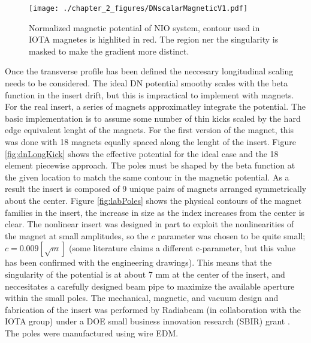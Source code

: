 \begin{figure}
	\centering
	\texttt{[image: ./chapter\_2\_figures/DNscalarMagneticV1.pdf]}
	\caption{Normalized magnetic potential of NIO system, contour used in IOTA magnetes is highlited in red. The region ner the singularity is masked to make the gradient more distinct.}
	\label{fig:dnMagPtCurve}
\end{figure}

Once the transverse profile has been defined the neccesary longitudinal scaling needs to be considered. The ideal DN potential smoothy scales with the beta function in the insert drift, but this is impractical to implement with magnets. For the real insert, a series of magnets approximatley integrate the potential. The basic implementation is to assume some number of thin kicks scaled by the hard edge equivalent lenght of the magnets. For the first version of the magnet, this was done with 18 magnets equally spaced along the lenght of the insert. Figure \ref{fig:dnLongKick} shows the effective potential for the ideal case and the 18 element piecewise approach. The poles must be shaped by the beta function at the given location to match the same contour in the magnetic potential. As a result the insert is composed of 9 unique pairs of magnets arranged symmetrically about the center. Figure \ref{fig:labPoles} shows the physical contours of the magnet families in the insert, the increase in size as the index increases from the center is clear. The nonlinear insert was designed in part to exploit the nonlinearities of the magnet at small amplitudes, so the $c$ parameter was chosen to be quite small; $c=0.009 [\sqrt{m}]$ (some literature claims a different c-parameter, but this value has been confirmed with the engineering drawings). This means that the singularity of the potential is at about 7 mm at the center of the insert, and neccesitates a carefully designed beam pipe to maximize the available aperture within the small poles. The mechanical, magnetic, and vacuum design and fabrication of the insert was performed by Radiabeam (in collaboration with the IOTA group) under a DOE small business innovation research (SBIR) grant \cite{radiabeamInsertReports}. The poles were manufactured using wire EDM.  


